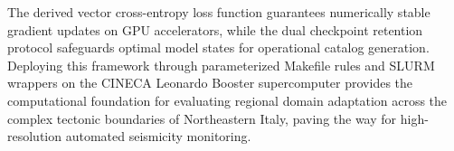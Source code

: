 The derived vector cross-entropy loss function guarantees numerically stable
gradient updates on \ac{GPU} accelerators, while the dual checkpoint
retention protocol
safeguards optimal model states for operational catalog generation.
Deploying this
framework through parameterized Makefile rules and SLURM wrappers on
the \ac{CINECA}
Leonardo Booster supercomputer provides the computational foundation for
evaluating regional domain adaptation across the complex tectonic boundaries of
Northeastern Italy, paving the way for high-resolution automated seismicity
monitoring.
